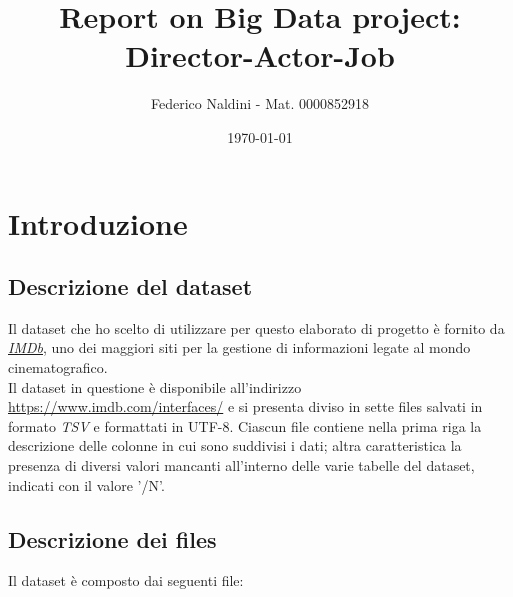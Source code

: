 \documentclass[hidelinks]{article}
\title{\textbf{Report on Big Data project: Director-Actor-Job}}
\author{
	Federico Naldini - Mat.  0000852918}
\date{\today}
\begin{document}
\maketitle
\newpage

\tableofcontents

\newpage

\section{Introduzione}
\subsection{Descrizione del dataset}
Il dataset che ho scelto di utilizzare per questo elaborato di progetto è fornito da \href{https://www.imdb.com/}{\textit{IMDb}}, uno dei maggiori siti per la gestione di informazioni legate al mondo cinematografico.\\
Il dataset in questione è disponibile all'indirizzo  \url{https://www.imdb.com/interfaces/} e si presenta diviso in sette files salvati in formato \textit{TSV} e formattati in UTF-8. Ciascun file contiene nella prima riga la descrizione delle colonne in cui sono suddivisi i dati; altra caratteristica la presenza di diversi valori mancanti all'interno delle varie tabelle del dataset, indicati con il valore '/N'.



\subsection{Descrizione dei files}

Il dataset è composto dai seguenti file:
\end{document}
